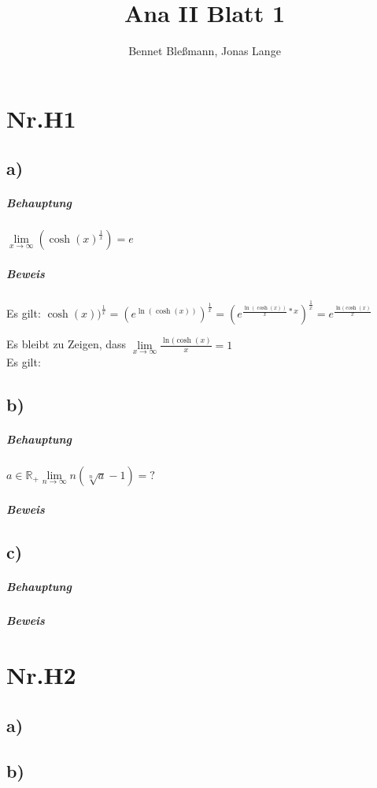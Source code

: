 \documentclass[12pt,a4paper,oneside,ngerman]{article} %
\title{Ana II Blatt 1}
\author{Bennet Bleßmann, Jonas Lange}
\begin{document}
\maketitle
\section*{Nr.H1}
\subsection*{a)}

\subparagraph*{Behauptung}

$\lim\limits_{x \to \infty}(\cosh(x)^{\frac{1}{x}}) = e$

\subparagraph*{Beweis}

Es gilt: $\cosh(x))^{\frac{1}{x}} = (e^{\ln(\cosh(x))})^{\frac{1}{x}}
= (e^{\frac {\ln(\cosh(x))}{x}*x})^{\frac{1}{x}} = e^{\frac{\ln(\cosh(x)}{x}}$

Es bleibt zu Zeigen, dass $\lim\limits_{x \to \infty}\frac{\ln(\cosh(x)}{x} = 1 $\\ 
\indent Es gilt:  


	
\subsection*{b)}

\subparagraph*{Behauptung}

$a \in \mathbb{R}_{+} \lim\limits_{n \to \infty} n(\sqrt[n]{a}-1) = ?$


\subparagraph*{Beweis}

\subsection*{c)}

\subparagraph*{Behauptung}

\subparagraph*{Beweis}

\section*{Nr.H2}

\subsection*{a)}

\subsection*{b)}
\end{document}
